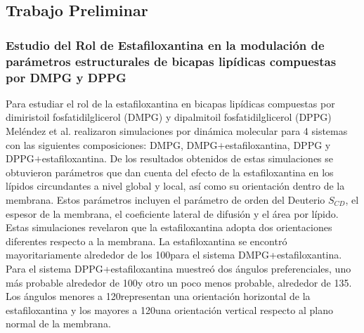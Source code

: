 \subsection{Trabajo Preliminar}\label{ss:pre}
\subsubsection{Estudio del Rol de Estafiloxantina en la modulaci\'{o}n de par\'{a}metros estructurales de bicapas lip\'{i}dicas compuestas por DMPG y DPPG  \cite{MelendezDelgado2018StudyingBilayers}}
Para estudiar el rol de la estafiloxantina en bicapas lip\'{i}dicas compuestas por dimiristoil fosfatidilglicerol (DMPG) y dipalmitoil fosfatidilglicerol (DPPG) Mel\'{e}ndez et al. \cite{MelendezDelgado2018StudyingBilayers} realizaron simulaciones por din\'{a}mica molecular para 4 sistemas con las siguientes composiciones: DMPG, DMPG$+$estafiloxantina, DPPG y DPPG$+$estafiloxantina. De los resultados obtenidos de estas simulaciones se obtuvieron par\'{a}metros que dan cuenta del efecto de la estafiloxantina en los l\'{i}pidos circundantes a nivel global y local, as\'{i} como su orientaci\'{o}n dentro de la membrana. Estos par\'{a}metros incluyen el par\'{a}metro de orden del Deuterio $S_{CD}$, el espesor de la membrana, el coeficiente lateral de difusi\'{o}n y el \'{a}rea por l\'{i}pido. \\

Estas simulaciones revelaron que la estafiloxantina adopta dos orientaciones diferentes respecto a la membrana. La estafiloxantina se encontr\'{o} mayoritariamente alrededor de los 100\textdegree para el sistema   DMPG+estafiloxantina. Para el sistema  DPPG+estafiloxantina muestre\'{o} dos \'{a}ngulos preferenciales,  uno m\'{a}s probable alrededor de 100\textdegree y otro un poco menos probable, alrededor de 135\textdegree. Los \'{a}ngulos menores a 120\textdegree representan una orientaci\'{o}n horizontal de la estafiloxantina y los mayores a 120\textdegree  una orientaci\'{o}n vertical respecto al plano normal de la membrana.\\

